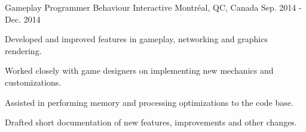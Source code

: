 \begin{cventries}
  \cventry
    {Gameplay Programmer} %
    {Behaviour Interactive} %
    {Montréal, QC, Canada} %
    {Sep. 2014 - Dec. 2014} %
    {
      \begin{cvitems} %
        \item {Developed and improved features in gameplay, networking and graphics rendering.}
        \item {Worked closely with game designers on implementing new mechanics and customizations.}
        \item {Assisted in performing memory and processing optimizations to the code base.}
        \item {Drafted short documentation of new features, improvements and other changes.}
        \\
      \end{cvitems}
    }

\end{cventries}
